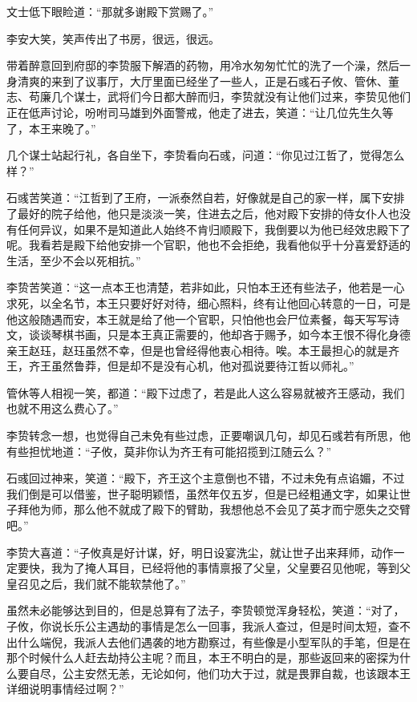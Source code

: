 文士低下眼睑道：“那就多谢殿下赏赐了。”

李安大笑，笑声传出了书房，很远，很远。

带着醉意回到府邸的李贽服下解酒的药物，用冷水匆匆忙忙的洗了一个澡，然后一身清爽的来到了议事厅，大厅里面已经坐了一些人，正是石彧石子攸、管休、董志、苟廉几个谋士，武将们今日都大醉而归，李贽就没有让他们过来，李贽见他们正在低声讨论，吩咐司马雄到外面警戒，他走了进去，笑道：“让几位先生久等了，本王来晚了。”

几个谋士站起行礼，各自坐下，李贽看向石彧，问道：“你见过江哲了，觉得怎么样？”

石彧苦笑道：“江哲到了王府，一派泰然自若，好像就是自己的家一样，属下安排了最好的院子给他，他只是淡淡一笑，住进去之后，他对殿下安排的侍女仆人也没有任何异议，如果不是知道此人始终不肯归顺殿下，我倒要以为他已经效忠殿下了呢。我看若是殿下给他安排一个官职，他也不会拒绝，我看他似乎十分喜爱舒适的生活，至少不会以死相抗。”

李贽苦笑道：“这一点本王也清楚，若非如此，只怕本王还有些法子，他若是一心求死，以全名节，本王只要好好对待，细心照料，终有让他回心转意的一日，可是他这般随遇而安，本王就是给了他一个官职，只怕他也会尸位素餐，每天写写诗文，谈谈琴棋书画，只是本王真正需要的，他却吝于赐予，如今本王恨不得化身德亲王赵珏，赵珏虽然不幸，但是也曾经得他衷心相待。唉。本王最担心的就是齐王，齐王虽然鲁莽，但是却不是没有心机，他对孤说要待江哲以师礼。”

管休等人相视一笑，都道：“殿下过虑了，若是此人这么容易就被齐王感动，我们也就不用这么费心了。”

李贽转念一想，也觉得自己未免有些过虑，正要嘲讽几句，却见石彧若有所思，他有些担忧地道：“子攸，莫非你认为齐王有可能招揽到江随云么？”

石彧回过神来，笑道：“殿下，齐王这个主意倒也不错，不过未免有点谄媚，不过我们倒是可以借鉴，世子聪明颖悟，虽然年仅五岁，但是已经粗通文字，如果让世子拜他为师，那么他不就成了殿下的臂助，我想他总不会见了英才而宁愿失之交臂吧。”

李贽大喜道：“子攸真是好计谋，好，明日设宴洗尘，就让世子出来拜师，动作一定要快，我为了掩人耳目，已经将他的事情禀报了父皇，父皇要召见他呢，等到父皇召见之后，我们就不能软禁他了。”

虽然未必能够达到目的，但是总算有了法子，李贽顿觉浑身轻松，笑道：“对了，子攸，你说长乐公主遇劫的事情是怎么一回事，我派人查过，但是时间太短，查不出什么端倪，我派人去他们遇袭的地方勘察过，有些像是小型军队的手笔，但是在那个时候什么人赶去劫持公主呢？而且，本王不明白的是，那些返回来的密探为什么要自尽，公主安然无恙，无论如何，他们功大于过，就是畏罪自裁，也该跟本王详细说明事情经过啊？”

